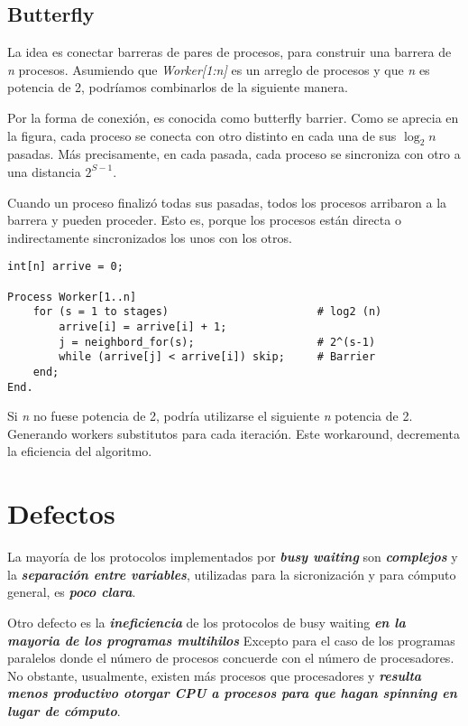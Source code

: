 \documentclass[a4paper, 10pt]{report}
\begin{document}
\subsection{Butterfly}
La idea es conectar barreras de pares de procesos, para construir una barrera de \emph{n} procesos. Asumiendo que \emph{Worker[1:n]} es un arreglo de procesos y que \emph{n} es potencia de 2, podríamos combinarlos de la siguiente manera.

Por la forma de conexión, es conocida como butterfly barrier. Como se aprecia en la figura, cada proceso se conecta con otro distinto en cada una de sus $\log_2n$ pasadas. Más precisamente, en cada pasada, cada proceso se sincroniza con otro a una distancia $2^{S-1}$.

Cuando un proceso finalizó todas sus pasadas, todos los procesos arribaron a la barrera y pueden proceder. Esto es, porque los procesos están directa o indirectamente sincronizados los unos con los otros.

\begin{lstlisting}
int[n] arrive = 0;

Process Worker[1..n]
    for (s = 1 to stages)                       # log2 (n)
        arrive[i] = arrive[i] + 1;
        j = neighbord_for(s);                   # 2^(s-1)
        while (arrive[j] < arrive[i]) skip;     # Barrier
    end;
End.
\end{lstlisting}

Si \emph{n} no fuese potencia de 2, podría utilizarse el siguiente \emph{n} potencia de 2. Generando workers substitutos para cada iteración. Este workaround, decrementa la eficiencia del algoritmo.

\section{Defectos}

La mayoría de los protocolos implementados por \textbf{\emph{busy waiting}} son \textbf{\emph{complejos}} y la \textbf{\emph{separación entre variables}}, utilizadas para la sicronización y para cómputo general, es \textbf{\emph{poco clara}}.

Otro defecto es la \textbf{\emph{ineficiencia}} de los protocolos de busy waiting \textbf{\emph{en la mayoria de los programas multihilos}} Excepto para el caso de los programas paralelos donde el número de procesos concuerde con el número de procesadores. No obstante, usualmente, existen más procesos que procesadores y \textbf{\emph{resulta menos productivo otorgar CPU a procesos para que hagan spinning en lugar de cómputo}}.
\end{document}
